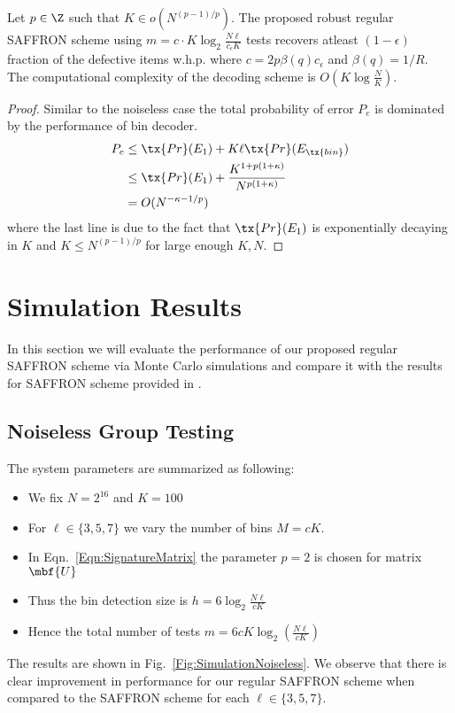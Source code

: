 \documentclass[conference,twocolumn]{IEEEtran}
\def\ceps{c_{\epsilon}}
\begin{document}
\begin{theorem}
Let $p\in\Z$ such that $K\in o\left(N^{(p-1)/p}\right)$. The proposed robust regular SAFFRON scheme using $m=c\cdot K \log_{2}\frac{N\ell}{\ceps K}$ tests recovers atleast $(1-\epsilon)$ fraction of the defective items w.h.p. where $c=2p\beta(q)\ceps$ and $\beta(q)=1/R$. The computational complexity of the decoding scheme is $O(K\log \frac{N}{K})$.
\end{theorem}
\begin{proof}
Similar to the noiseless case the total probability of error $P_e$ is dominated by the performance of bin decoder. 
\begin{align*}
P_e &\leq  \tx{Pr}(E_1)+ K\ell \tx{ Pr}(E_{\tx{bin}})\\
               &\leq \tx{Pr}(E_1)+ \frac{K^{1+p(1+\kappa)}}{N^{p(1+\kappa)}}\\
               &=O(N^{-\kappa-1/p})
\end{align*}
where the last line is due to the fact that $\tx{Pr}(E_1)$ is exponentially decaying in $K$ and $K\leq N^{(p-1)/p}$ for large enough $K,N$.
\end{proof}

\section{Simulation Results}
In this section we will evaluate the performance of our proposed regular SAFFRON scheme via Monte Carlo simulations and compare it with the results for SAFFRON scheme provided in \cite{lee2015saffron}.
\subsection*{Noiseless Group Testing}
The system parameters are summarized as following:
\begin{itemize}
\item We fix $N=2^{16}$ and $K=100$
\item For $\ell\in\{3,5,7\}$ we vary the number of bins $M=c K$. 
\item In Eqn.~\ref{Eqn:SignatureMatrix} the parameter $p=2$ is chosen for matrix $\mbf{U}$
\item Thus the bin detection size is $h=6\log_2 \frac{N\ell}{cK}$
\item Hence the total number of tests $m=6cK\log_2 \left(\frac{N\ell}{cK}\right)$
\end{itemize} 
The results are shown in Fig.~\ref{Fig:SimulationNoiseless}. We observe that there is clear improvement in performance for our regular SAFFRON scheme when compared to the SAFFRON scheme for each $\ell\in\{3,5,7\}$.
\end{document}
